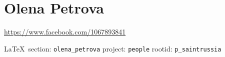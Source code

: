  
 
\section{Olena Petrova}
\url{https://www.facebook.com/1067893841}
  
\vspace{0.5cm}
 {	\ifDEBUG		\small		\LaTeX~section: \verb|olena_petrova| project: \verb|people| rootid: \verb|p_saintrussia|		\fi}
\vspace{0.5cm}



